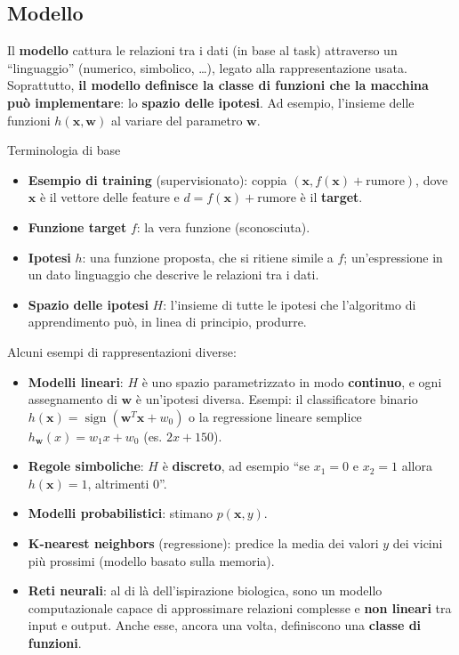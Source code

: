 \subsection{Modello}\label{modello}

Il \textbf{modello} cattura le relazioni tra i dati (in base al task)
attraverso un ``linguaggio'' (numerico, simbolico, \ldots), legato alla
rappresentazione usata. Soprattutto, \textbf{il modello definisce la
classe di funzioni che la macchina può implementare}: lo \textbf{spazio
delle ipotesi}. Ad esempio, l'insieme delle funzioni
\(h(\mathbf{x}, \mathbf{w})\) al variare del parametro \(\mathbf{w}\).

\begin{boxdefinition}{Terminologia di base}

\begin{itemize}
\tightlist
\item
  \textbf{Esempio di training} (supervisionato): coppia
  \((\mathbf{x}, f(\mathbf{x}) + \text{rumore})\), dove \(\mathbf{x}\) è
  il vettore delle feature e \(d = f(\mathbf{x}) + \text{rumore}\) è il
  \textbf{target}.
\item
  \textbf{Funzione target} \(f\): la vera funzione (sconosciuta).
\item
  \textbf{Ipotesi} \(h\): una funzione proposta, che si ritiene simile a
  \(f\); un'espressione in un dato linguaggio che descrive le relazioni
  tra i dati.
\item
  \textbf{Spazio delle ipotesi} \(H\): l'insieme di tutte le ipotesi che
  l'algoritmo di apprendimento può, in linea di principio, produrre.
\end{itemize}

\end{boxdefinition}

Alcuni esempi di rappresentazioni diverse:

\begin{itemize}
\tightlist
\item
  \textbf{Modelli lineari}: \(H\) è uno spazio parametrizzato in modo
  \textbf{continuo}, e ogni assegnamento di \(\mathbf{w}\) è un'ipotesi
  diversa. Esempi: il classificatore binario
  \(h(\mathbf{x}) = \operatorname{sign}(\mathbf{w}^T\mathbf{x} + w_0)\)
  o la regressione lineare semplice \(h_\mathbf{w}(x) = w_1 x + w_0\)
  (es. \(2x + 150\)).
\item
  \textbf{Regole simboliche}: \(H\) è \textbf{discreto}, ad esempio ``se
  \(x_1 = 0\) e \(x_2 = 1\) allora \(h(\mathbf{x}) = 1\), altrimenti
  \(0\)''.
\item
  \textbf{Modelli probabilistici}: stimano \(p(\mathbf{x}, y)\).
\item
  \textbf{K-nearest neighbors} (regressione): predice la media dei
  valori \(y\) dei vicini più prossimi (modello basato sulla memoria).
\item
  \textbf{Reti neurali}: al di là dell'ispirazione biologica, sono un
  modello computazionale capace di approssimare relazioni complesse e
  \textbf{non lineari} tra input e output. Anche esse, ancora una volta,
  definiscono una \textbf{classe di funzioni}.
\end{itemize}

